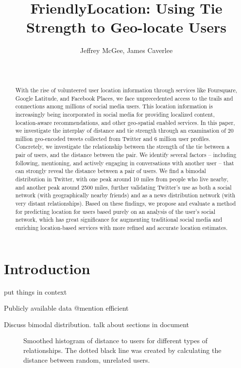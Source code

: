 \documentclass{sig-alternate}
\title{FriendlyLocation: Using Tie Strength to Geo-locate Users
}
\author{
    \alignauthor Jeffrey McGee, James Caverlee\\
    \affaddr{Department of Computer Science and Engineering, Texas A\&M
    University} \\
    \affaddr{ College Station, TX 77845 USA} \\
    \email{jeffamcgee@tamu.edu, caverlee@cse.tamu.edu}
}
\begin{document}
\maketitle
\begin{abstract}
With the rise of volunteered user location information through services like
Foursquare, Google Latitude, and Facebook Places, we face unprecedented access
to the trails and connections among millions of social media users. This
location information is increasingly being incorporated in social media for
providing localized content, location-aware recommendations, and other
geo-spatial enabled services. In this paper, we investigate the interplay of
distance and tie strength through an examination of 20 million geo-encoded
tweets collected from Twitter and 6 million user profiles. Concretely, we
investigate the relationship between the strength of the tie between a pair of
users, and the distance between the pair. We identify several factors --
including following, mentioning, and actively engaging in conversations with
another user -- that can strongly reveal the distance between a pair of users.
We find a bimodal distribution in Twitter, with one peak around 10 miles from
people who live nearby, and another peak around 2500 miles, further validating
Twitter's use as both a social network (with geographically nearby friends) and
as a news distribution network (with very distant relationships). Based on
these findings, we propose and evaluate a method for predicting location for
users based purely on an analysis of the user's social network, which has great
significance for augmenting traditional social media and enriching
location-based services with more refined and accurate location estimates.

\end{abstract}




\section{Introduction}

put things in context

Publicly available data
@mention
efficient


Discuss bimodal distribution.
talk about sections in document

\begin{figure}
\centering
{}
\caption{
Smoothed histogram of distance to users for different types of relationships.
The dotted black line was created by calculating the distance between random, unrelated users.
}
\label{fig:EdgeTypes}
\end{figure}
\end{document}
